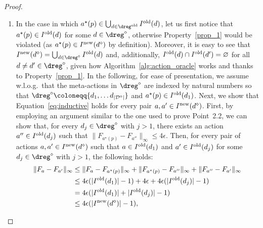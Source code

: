 \begin{proof}
\begin{enumerate}
\begin{enumerate}
			\item In the case in which $a^\star(p) \in  \bigcup_{d \in \dreg^{\textnormal{old}}} I^{\textnormal{old}}(d)$, let us first notice that $a^\star(p) \in I^{\textnormal{old}}(d)$ for some $d \in \dreg^\diamond$, otherwise Property~\ref{prop_1} would be violated (as $a^\star(p) \in I^{\textnormal{new}}(d^\diamond)$ by definition).
			Moreover, it is easy to see that $I^\textnormal{new}(d^\diamond)= \bigcup_{d \in \dreg^{\diamond} } I^\textnormal{old}(d)$ and, additionally, $I^\textnormal{old}(d) \cap I^\textnormal{old}(d') = \varnothing$ for all $d \neq d' \in \dreg^\diamond$, given how Algorithm~\ref{alg:action_oracle} works and thanks to Property~\ref{prop_1}.
			In the following, for ease of presentation, we assume w.l.o.g.~that the meta-actions in $\dreg^\diamond$ are indexed by natural numbers so that $\dreg^{\diamond} \coloneqq \{ d_1, \dots d_{|\mathcal{D}^\diamond|}\}$ and $a^\star(p) \in I^{\textnormal{old}}(d_1)$.
			Next, we show that Equation~\eqref{eq:inductive} holds for every pair $a, a' \in I^\textnormal{new}(d^\diamond)$.
			First, by employing an argument similar to the one used to prove Point~2.2, we can show that, for every $d_j \in \dreg^\diamond$ with $j > 1$, there exists an action $a'' \in I^{\textnormal{old}}(d_j)$ such that $\| F_{a^\star(p) }- F_{a''}\|_{\infty} \le 4 \epsilon$. Then, for every pair of actions $a, a' \in I^\textnormal{new}(d^\diamond)$ such that $a \in I^{\textnormal{old}}(d_1)$ and $a' \in I^{\textnormal{old}}(d_j)$ for some $d_j \in \dreg^\diamond$ with $j > 1$, the following holds:
			\begin{align*}
				\| F_{a }- F_{a'}\|_{\infty} & \le \| F_{a}  - F_{a^\star(p) } \|_{\infty} + \| F_{a^\star(p) }- F_{a''}  \|_{\infty} + \|  F_{a''} - F_{a'}  \|_{\infty}\\
				&   \le 4 \epsilon( | I^{\textnormal{old}}(d_1)| -1 ) + 4 \epsilon + 4 \epsilon( | I^{\textnormal{old}}({d_j}) | -1 )\\
				&   = 4 \epsilon( | I^{\textnormal{old}}({d_1})| + | I^{\textnormal{old}}({d_j} ) |-1 )  \\
				&  \leq 4 \epsilon( | I^{\textnormal{new}}(d^\diamond) | -1 ),	 	
			\end{align*}

\end{enumerate}
\end{enumerate}
\end{proof}
